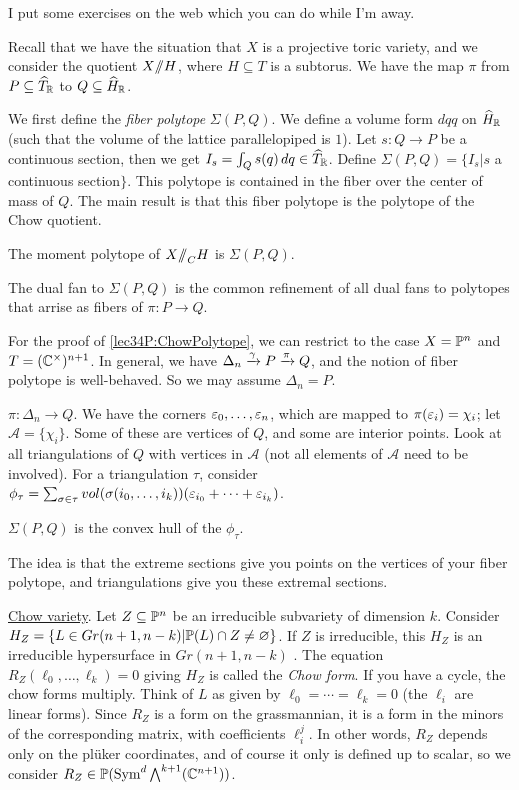 \renewcommand{\A}{\mathcal A}

I put some exercises on the web which you can do while I'm away.

Recall that we have the situation that $X$ is a projective toric variety, and we consider the quotient $X\mbox{\rm /\!\!/} H$, where $H\subseteq T$ is a subtorus. We have the map $\pi$ from $P\subseteq \widehat{T}_{\mathbb{R}}$ to $Q\subseteq \widehat{H}_{\mathbb{R}}$.

We first define the \emph{fiber polytope} $\Sigma(P,Q)$. We define a volume form $dqq$ on $\widehat{H}_{\mathbb{R}}$ (such that the volume of the lattice parallelopiped is $1$). Let $s\colon Q\to P$ be a continuous section, then we get $I_s=\int_Q s(q)\,dq\in \widehat{T}_{\mathbb{R}}$. Define $\Sigma(P,Q)=\{I_s|s$ a continuous section$\}$. This polytope is contained in the fiber over the center of mass of $Q$. The main result is that this fiber polytope is the polytope of the Chow quotient.
\begin{proposition}\label{lec34P:ChowPolytope}
 The moment polytope of $X\mbox{\rm /\!\!/}_C H$ is $\Sigma(P,Q)$.
\end{proposition}
\begin{proposition}
 The dual fan to $\Sigma(P,Q)$ is the common refinement of all dual fans to polytopes that arrise as fibers of $\pi\colon P\to Q$.
\end{proposition}
For the proof of \ref{lec34P:ChowPolytope}, we can restrict to the case $X=\mathbb{P}^n$ and $T=(\mathbb{C}^\times)^{n+1}$. In general, we have $\Delta_n\xrightarrow{\gamma} P\xrightarrow\pi Q$, and the notion of fiber polytope is well-behaved. So we may assume $\Delta_n=P$.

$\pi\colon \Delta_n\to Q$. We have the corners $\varepsilon_0,\dots, \varepsilon_n$, which are mapped to $\pi(\varepsilon_i)=\chi_i$; let $\A=\{\chi_i\}$. Some of these are vertices of $Q$, and some are interior points. Look at all triangulations of $Q$ with vertices in $\A$ (not all elements of $\A$ need to be involved). For a triangulation $\tau$, consider $\phi_\tau = \sum_{\sigma\in \tau} vol(\sigma(i_0,\dots, i_k))(\varepsilon_{i_0}+\cdots +\varepsilon_{i_k})$.
\begin{claim}
 $\Sigma(P,Q)$ is the convex hull of the $\phi_\tau$.
\end{claim}
The idea is that the extreme sections give you points on the vertices of your fiber polytope, and triangulations give you these extremal sections.

\medskip

\underline{Chow variety}. Let $Z\subseteq \mathbb{P}^n$ be an irreducible subvariety of dimension $k$. Consider $H_Z=\{L\in Gr(n+1,n-k)|\mathbb{P}(L)\cap Z\neq\varnothing\}$. If $Z$ is irreducible, this $H_Z$ is an irreducible hypersurface in $Gr(n+1,n-k)$ . The equation $R_Z(\ell_0,\dots, \ell_k)=0$ giving $H_Z$ is called the \emph{Chow form}. If you have a cycle, the chow forms multiply. Think of $L$ as given by $\ell_0=\cdots =\ell_k=0$ (the $\ell_i$ are linear forms). Since $R_Z$ is a form on the grassmannian, it is a form in the minors of the corresponding matrix, with coefficients $\ell_i^j$. In other words, $R_Z$ depends only on the pl\"uker coordinates, and of course it only is defined up to scalar, so we consider $R_Z\in \mathbb{P}(\operatorname{Sym}^d \bigwedge^{k+1}(\mathbb{C}^{n+1}))$.

